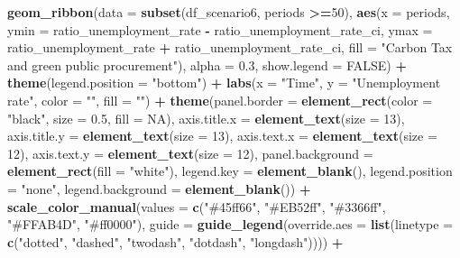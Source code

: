 \documentclass[
]{article}
\newenvironment{Shaded}{\begin{snugshade}}{\end{snugshade}}
\newcommand{\AttributeTok}[1]{\textcolor[rgb]{0.13,0.29,0.53}{#1}}
\newcommand{\ConstantTok}[1]{\textcolor[rgb]{0.56,0.35,0.01}{#1}}
\newcommand{\DecValTok}[1]{\textcolor[rgb]{0.00,0.00,0.81}{#1}}
\newcommand{\FloatTok}[1]{\textcolor[rgb]{0.00,0.00,0.81}{#1}}
\newcommand{\FunctionTok}[1]{\textcolor[rgb]{0.13,0.29,0.53}{\textbf{#1}}}
\newcommand{\NormalTok}[1]{#1}
\newcommand{\SpecialCharTok}[1]{\textcolor[rgb]{0.81,0.36,0.00}{\textbf{#1}}}
\newcommand{\StringTok}[1]{\textcolor[rgb]{0.31,0.60,0.02}{#1}}
\begin{document}
\begin{Shaded}
\begin{Highlighting}[]
  \FunctionTok{geom\_ribbon}\NormalTok{(}\AttributeTok{data =} \FunctionTok{subset}\NormalTok{(df\_scenario6, periods }\SpecialCharTok{\textgreater{}=}\DecValTok{50}\NormalTok{), }\FunctionTok{aes}\NormalTok{(}\AttributeTok{x =}\NormalTok{ periods, }\AttributeTok{ymin =}\NormalTok{ ratio\_unemployment\_rate }\SpecialCharTok{{-}}\NormalTok{ ratio\_unemployment\_rate\_ci, }\AttributeTok{ymax =}\NormalTok{ ratio\_unemployment\_rate }\SpecialCharTok{+}\NormalTok{ ratio\_unemployment\_rate\_ci, }\AttributeTok{fill =} \StringTok{"Carbon Tax and green public procurement"}\NormalTok{), }\AttributeTok{alpha =} \FloatTok{0.3}\NormalTok{, }\AttributeTok{show.legend =} \ConstantTok{FALSE}\NormalTok{) }\SpecialCharTok{+}
  \FunctionTok{theme}\NormalTok{(}\AttributeTok{legend.position =} \StringTok{"bottom"}\NormalTok{) }\SpecialCharTok{+}
  \FunctionTok{labs}\NormalTok{(}\AttributeTok{x =} \StringTok{"Time"}\NormalTok{, }\AttributeTok{y =} \StringTok{"Unemployment rate"}\NormalTok{, }\AttributeTok{color =} \StringTok{""}\NormalTok{, }\AttributeTok{fill =} \StringTok{""}\NormalTok{) }\SpecialCharTok{+}
  \FunctionTok{theme}\NormalTok{(}\AttributeTok{panel.border =} \FunctionTok{element\_rect}\NormalTok{(}\AttributeTok{color =} \StringTok{"black"}\NormalTok{, }\AttributeTok{size =} \FloatTok{0.5}\NormalTok{, }\AttributeTok{fill =} \ConstantTok{NA}\NormalTok{),}
        \AttributeTok{axis.title.x =} \FunctionTok{element\_text}\NormalTok{(}\AttributeTok{size =} \DecValTok{13}\NormalTok{),}
        \AttributeTok{axis.title.y =} \FunctionTok{element\_text}\NormalTok{(}\AttributeTok{size =} \DecValTok{13}\NormalTok{),}
        \AttributeTok{axis.text.x =} \FunctionTok{element\_text}\NormalTok{(}\AttributeTok{size =} \DecValTok{12}\NormalTok{),}
        \AttributeTok{axis.text.y =} \FunctionTok{element\_text}\NormalTok{(}\AttributeTok{size =} \DecValTok{12}\NormalTok{),}
        \AttributeTok{panel.background =} \FunctionTok{element\_rect}\NormalTok{(}\AttributeTok{fill =} \StringTok{"white"}\NormalTok{),}
        \AttributeTok{legend.key =} \FunctionTok{element\_blank}\NormalTok{(),}
         \AttributeTok{legend.position =} \StringTok{"none"}\NormalTok{,}
        \AttributeTok{legend.background =} \FunctionTok{element\_blank}\NormalTok{()) }\SpecialCharTok{+}
  \FunctionTok{scale\_color\_manual}\NormalTok{(}\AttributeTok{values =} \FunctionTok{c}\NormalTok{(}\StringTok{"\#45ff66"}\NormalTok{, }\StringTok{"\#EB52ff"}\NormalTok{, }\StringTok{"\#3366ff"}\NormalTok{, }\StringTok{"\#FFAB4D"}\NormalTok{, }\StringTok{"\#ff0000"}\NormalTok{),}
                     \AttributeTok{guide =} \FunctionTok{guide\_legend}\NormalTok{(}\AttributeTok{override.aes =} \FunctionTok{list}\NormalTok{(}\AttributeTok{linetype =} \FunctionTok{c}\NormalTok{(}\StringTok{"dotted"}\NormalTok{, }\StringTok{"dashed"}\NormalTok{, }\StringTok{"twodash"}\NormalTok{, }\StringTok{"dotdash"}\NormalTok{, }\StringTok{"longdash"}\NormalTok{)))) }\SpecialCharTok{+}

\end{Highlighting}
\end{Shaded}
\end{document}
